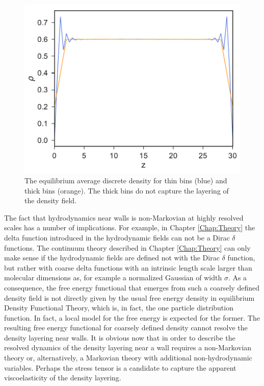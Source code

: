 \documentclass[b5paper,openright,10pt]{book}
\begin{document}
\begin{figure}[h!]
  \centering
\includegraphics[scale=0.41]{DensityProfile-WALLS}
\caption[Comparison between the fluid density profile for thin and thick bins]{The equilibrium average discrete density for thin bins (blue) and thick bins (orange). The thick bins do not capture the layering of the density field.}
\label{fig:DensityProfile-WALLS}
\end{figure}

The  fact that  hydrodynamics near  walls is  non-Markovian at  highly
resolved  scales  has a  number  of  implications. For example, in Chapter \ref{Chap:Theory} the delta function introduced in the hydrodynamic fields can not be a Dirac $\delta$ functions. 
The continuum theory  described in Chapter \ref{Chap:Theory} can  only make
sense if the hydrodynamic fields are  defined not with the Dirac $\delta$
function, but  rather with  coarse delta  functions with  an intrinsic
length  scale  larger than  molecular  dimensions  as, for  example  a
normalized Gaussian  of width  $\sigma$.  As  a consequence,  the free
energy functional  that emerges from  such a coarsely  defined density
field  is not  directly  given by  the usual  free  energy density  in
equilibrium  Density Functional  Theory, which  is, in  fact, the  one
particle distribution function.  In fact,  a local model for the free energy 
is expected for  the former. The resulting free  energy functional for
coarsely  defined density  cannot  resolve the  density layering  near
walls.   It is  obvious now  that in  order to  describe the  resolved
dynamics of the density layering  near a wall requires a non-Markovian
theory  or,   alternatively,  a   Markovian  theory   with  additional
non-hydrodynamic variables.  Perhaps the  stress tensor is a candidate
to capture the apparent viscoelasticity of the density layering.
\end{document}
